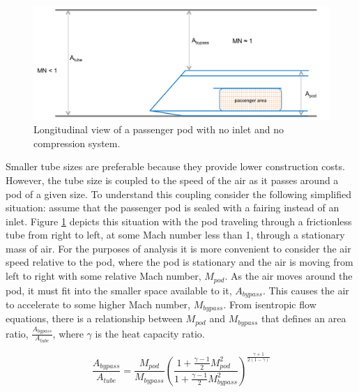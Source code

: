 \documentclass[heading.tex]{subfiles}
\begin{document}
\begin{figure}[hbtp]
\centering
\includegraphics[width=.85\textwidth]{images/closedCapsule.png}
\caption{Longitudinal view of a passenger pod with no inlet and no compression system.}
\label{f:ClosedPod}
\end{figure}

Smaller tube sizes are preferable because they provide lower construction costs. However, 
the tube size is coupled to the speed of the air as it passes around a pod of a given size. 
To understand this coupling consider the following simplified situation: assume that the passenger pod is sealed with a fairing
instead of an inlet. Figure \ref{f:ClosedPod} depicts this situation with the pod
traveling through a frictionless tube from right to left, at some Mach number less than 1, through a stationary mass of air. 
For the purposes of analysis it is more convenient to consider the air speed relative to the pod, 
where the pod is stationary and the air is moving from left to right with some relative Mach number, $M_{pod}$. 
As the air moves around the pod, it must fit into the smaller space available to it, $A_{bypass}$.
This causes the air to accelerate to some higher Mach number, $M_{bypass}$.
From isentropic flow equations, there is a relationship between 
$M_{pod}$ and $M_{bypass}$ that defines an area ratio, $\frac{A_{bypass}}{A_{tube}}$, where $\gamma$ is the heat capacity ratio.

\begin{equation}
\frac{A_{bypass}}{A_{tube}} = \frac{M_{pod}}{M_{bypass}}
\left(\frac{1+ \frac{\gamma-1}{2} M_{pod\ \ \ }^2}
{1+ \frac{\gamma-1}{2} M_{bypass}^2}\right)^{\frac{\gamma+1}{2\left(1-\gamma\right)}}
\label{e:a-over-astar}
\end{equation}
\end{document}
